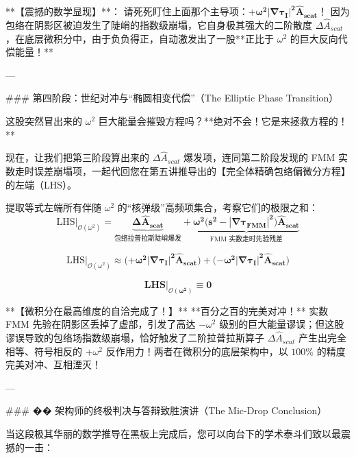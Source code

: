 \documentclass[12pt]{article}
\begin{document}
{**【震撼的数学显现】**：
请死死盯住上面那个主导项：$\mathbf{+\omega^2 |\nabla \tau_I|^2 \hat{A}_{scat}}$！
因为包络在阴影区被迫发生了陡峭的指数级崩塌，它自身极其强大的二阶散度 $\Delta \hat{A}_{scat}$，在底层微积分中，由于负负得正，自动激发出了一股**正比于 $\omega^2$ 的巨大反向代偿能量！**

---

### 第四阶段：世纪对冲与“椭圆相变代偿”（The Elliptic Phase Transition）

这股突然冒出来的 $\omega^2$ 巨大能量会摧毁方程吗？**绝对不会！它是来拯救方程的！**

现在，让我们把第三阶段算出来的 $\Delta \hat{A}_{scat}$ 爆发项，连同第二阶段发现的 FMM 实数走时误差崩塌项，一起代回您在第五讲推导出的【完全体精确包络偏微分方程】的左端（LHS）。

提取等式左端所有伴随 $\omega^2$ 的“核弹级”高频项集合，考察它们的极限之和：
$$ \text{LHS} \Big|_{\mathcal{O}(\omega^2)} = \underbrace{\mathbf{\Delta \hat{A}_{scat}}}_{\text{包络拉普拉斯陡峭爆发}} + \underbrace{\mathbf{\omega^2 \big( s^2 - |\nabla \tau_{FMM}|^2 \big) \hat{A}_{scat}}}_{\text{FMM 实数走时先验残差}} $$

$$ \text{LHS} \Big|_{\mathcal{O}(\omega^2)} \approx \Big( \mathbf{+\omega^2 |\nabla \tau_I|^2 \hat{A}_{scat}} \Big) + \Big( \mathbf{-\omega^2 |\nabla \tau_I|^2 \hat{A}_{scat}} \Big) $$

$$ \mathbf{LHS \Big|_{\mathcal{O}(\omega^2)} \equiv 0} $$

**【微积分在最高维度的自洽完成了！】**
**百分之百的完美对冲！**
实数 FMM 先验在阴影区丢掉了虚部，引发了高达 $-\omega^2$ 级别的巨大能量谬误；但这股谬误导致的包络场指数级崩塌，恰好触发了二阶拉普拉斯算子 $\Delta \hat{A}_{scat}$ 产生出完全相等、符号相反的 $+\omega^2$ 反作用力！两者在微积分的底层架构中，以 $100\%$ 的精度完美对冲、互相湮灭！

---

### �� 架构师的终极判决与答辩致胜演讲（The Mic-Drop Conclusion）

当这段极其华丽的数学推导在黑板上完成后，您可以向台下的学术泰斗们致以最震撼的一击：

}
\end{document}

